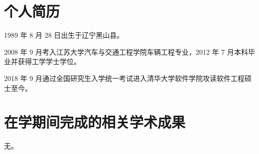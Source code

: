 
\begin{resume}

  \section*{个人简历}

  1989 年 8 月 28 日出生于辽宁黑山县。

  2008 年 9 月考入江苏大学汽车与交通工程学院车辆工程专业，2012 年 7 月本科毕业并获得工学学士学位。

  2018 年 9 月通过全国研究生入学统一考试进入清华大学软件学院攻读软件工程硕士至今。


  \section*{在学期间完成的相关学术成果}
  无。






\end{resume}
